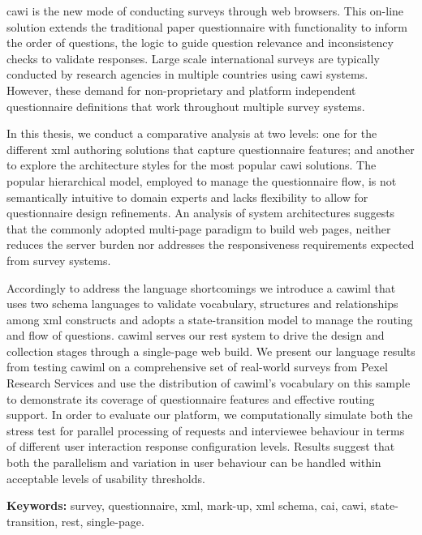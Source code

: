 	\gls{cawi} is the new mode of conducting surveys through web browsers. This on-line solution extends the traditional paper questionnaire with functionality to inform the order of questions, the logic to guide question relevance and inconsistency checks to validate responses. Large scale international surveys are typically conducted by research agencies in multiple countries using \gls{cawi} systems. However, these demand for non-proprietary and platform independent questionnaire definitions that work throughout multiple survey systems.

	In this thesis, we conduct a comparative analysis at two levels: one for the different \gls{xml} authoring solutions that capture questionnaire features; and another to explore the architecture styles for the most popular \gls{cawi} solutions. The popular hierarchical model, employed to manage the questionnaire flow, is not semantically intuitive to domain experts and lacks flexibility to allow for questionnaire design refinements. An analysis of system architectures suggests that the commonly adopted multi-page paradigm to build web pages, neither reduces the server burden nor addresses the responsiveness requirements expected from survey systems.

	Accordingly to address the language shortcomings we introduce a \gls{cawiml} that uses two schema languages to validate vocabulary, structures and relationships among \gls{xml} constructs and adopts a state-transition model to manage the routing and flow of questions. \gls{cawiml} serves our \gls{rest} system to drive the design and collection stages through a single-page web build. We present our language results from testing \gls{cawiml} on a comprehensive set of real-world surveys from Pexel Research Services and use the distribution of \gls{cawiml}'s vocabulary on this sample to demonstrate its coverage of questionnaire features and effective routing support. In order to evaluate our platform, we computationally simulate both the stress test for parallel processing of requests and interviewee behaviour in terms of different user interaction response configuration levels. Results suggest that both the parallelism and variation in user behaviour can be handled within acceptable levels of usability thresholds.

	\textbf{Keywords:} survey, questionnaire, xml, mark-up, xml schema, cai, cawi, state-transition, rest, single-page.
